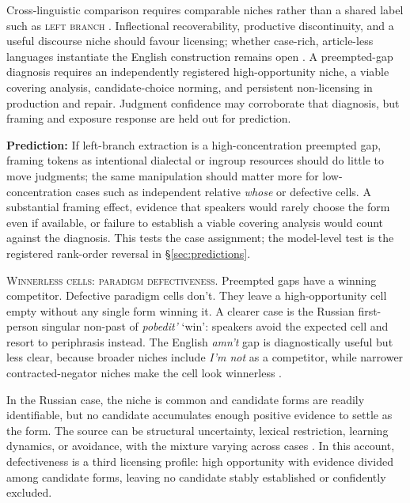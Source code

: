\documentclass[12pt,letterpaper]{article}
\newcommand{\term}[1]{\textsc{#1}}
\newcommand{\mention}[1]{\textit{#1}}
\newcommand{\olang}[1]{\textit{#1}}
\begin{document}
Cross-linguistic comparison requires comparable niches rather than a shared
label such as \term{left branch} \autocite{haspelmath2010}. Inflectional
recoverability, productive discontinuity, and a useful discourse niche should favour licensing;
whether case-rich, article-less languages instantiate the English construction
remains open \autocite{reynolds2026lbe}. A preempted-gap diagnosis requires
an independently registered high-opportunity niche, a viable covering analysis,
candidate-choice norming, and persistent non-licensing in production and repair.
Judgment confidence may corroborate that diagnosis, but framing and exposure
response are held out for prediction.

\textbf{Prediction:} If left-branch extraction is a high-concentration preempted gap,
framing tokens as intentional dialectal or ingroup resources should do little to
move judgments; the same manipulation should matter more for low-concentration
cases such as independent relative \mention{whose} or defective cells. A
substantial framing effect, evidence that speakers would rarely choose the form
even if available, or failure to establish a viable covering analysis would
count against the diagnosis.
This tests the case assignment; the model-level test is the registered
rank-order reversal in \S\ref{sec:predictions}.

\noindent\textsc{Winnerless cells: paradigm defectiveness.} Preempted gaps have a winning competitor. Defective paradigm
cells don't. They leave a high-opportunity cell empty without any single form
winning it. A clearer case is the Russian first-person singular non-past of
\olang{pobedit'} `win': speakers avoid the expected cell and resort to
periphrasis instead. The English \mention{amn't} gap is diagnostically useful but
less clear, because broader niches include \mention{I'm not} as a competitor,
while narrower contracted-negator niches make the cell look winnerless
\citep{Broadbent2009Amnt,ThomsEtAl2025Amnt,Sims2023Defectiveness,
Pertsova2016RussianGaps,PertsovaKuznetsova2015Russian}.

In the Russian case, the niche is common and candidate forms are readily identifiable, but no candidate
accumulates enough positive evidence to settle as the form. The source can be
structural uncertainty, lexical restriction, learning dynamics, or avoidance,
with the mixture varying across cases \citep{Sims2023Defectiveness}. In this
account, defectiveness is a third licensing profile: high opportunity with
evidence divided among candidate forms, leaving no candidate stably established
or confidently excluded.
\end{document}
